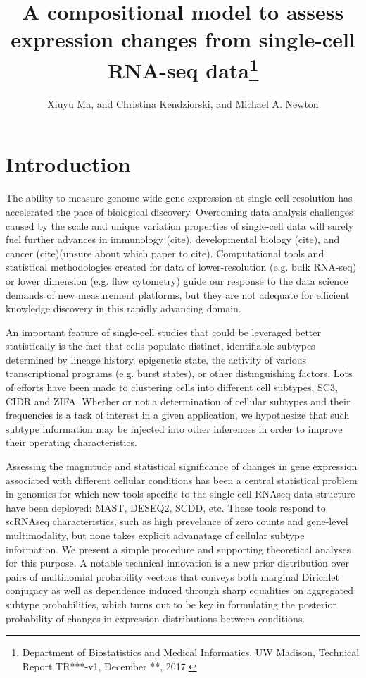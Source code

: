 \documentclass[11pt]{amsart}
\title{A compositional model to assess expression changes from
 single-cell RNA-seq data\footnote{Department of Biostatistics and Medical Informatics, UW Madison, Technical Report TR***-v1, December **, 2017.}}
\author{Xiuyu Ma,  and Christina Kendziorski, and Michael A. Newton}
\begin{document}
\maketitle
\section{Introduction}

The ability to measure genome-wide gene expression at single-cell resolution 
has accelerated the pace of biological discovery\cite{scs}.  Overcoming data
analysis challenges caused by the scale and unique variation properties of single-cell
data will surely fuel further advances in immunology (cite), developmental
biology (cite), and cancer (cite)(unsure about which paper to cite).  Computational tools and statistical methodologies 
created for data of lower-resolution (e.g. bulk RNA-seq) or lower dimension 
(e.g. flow cytometry)  guide our response to 
 the data science demands of new measurement platforms,
but they are not adequate for efficient knowledge discovery in this
rapidly advancing domain\cite{Bacher:2016aa}.

An important feature of single-cell studies that could be leveraged better
statistically is the fact that cells populate distinct, identifiable subtypes
determined by lineage history, epigenetic state, the activity
of various transcriptional programs (e.g. burst states), or other 
distinguishing factors. Lots of efforts have been made to clustering cells
into different cell subtypes, SC3\cite{sc3}, CIDR\cite{CIDR} and ZIFA\cite{ZIFA}.
Whether or not a determination of cellular subtypes and their frequencies 
is a task of interest in a given application, we hypothesize that such
subtype information may be injected into other inferences in order
to improve their operating characteristics.

Assessing the magnitude and statistical significance of changes in gene
expression associated with different cellular conditions has been a central
statistical problem in genomics for which new tools specific to
the single-cell RNAseq data structure have been deployed: MAST\cite{ref:MAST},
DESEQ2\cite{ref:Des}, SCDD\cite{ref:scDD}, etc.  These tools respond
to scRNAseq characteristics, such as high prevelance of zero counts and
gene-level multimodality, but none takes explicit advanatage of cellular subtype
information.  We present a simple procedure and supporting theoretical
analyses for this purpose.  A notable technical innovation is a new prior
distribution over pairs of multinomial probability vectors that conveys
both marginal Dirichlet conjugacy as well as
 dependence induced through sharp equalities on aggregated 
 subtype probabilities, which turns out to be key in formulating 
 the posterior probability of changes in expression distributions between conditions.
 
\end{document}
